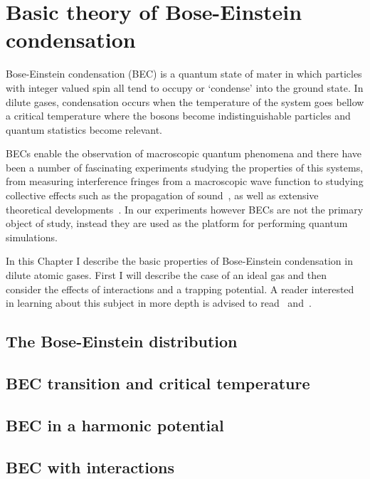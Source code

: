 
\renewcommand{\thechapter}{2}

\chapter{Basic theory of Bose-Einstein condensation}

Bose-Einstein condensation (BEC) is a quantum state of mater in which particles with integer valued spin all tend to occupy or `condense' into the ground state. In dilute gases, condensation occurs when the temperature of the system goes bellow a critical temperature where the bosons become indistinguishable particles and quantum statistics become relevant. 

BECs enable the observation of macroscopic quantum phenomena and there have been a number of fascinating experiments studying the properties of this systems, from measuring interference fringes from a macroscopic wave function to studying collective effects such as the propagation of sound~\cite{ketterle_w._making_1999}, as well as extensive theoretical developments~\cite{dalfovo_theory_1999}. In our experiments however BECs are not the primary object of study, instead they are used as the platform for performing quantum simulations. 

In this Chapter I describe the basic properties of Bose-Einstein condensation in dilute atomic gases. First I will describe the case of an ideal gas and then consider the effects of interactions and a trapping potential. A reader interested in learning about this subject in more depth is advised to read~\cite{Pethick} and~\cite{noauthor_bose-einstein_2003}.

\section{The Bose-Einstein distribution}

\section{BEC transition and critical temperature}
\section{BEC in a harmonic potential}
\section{BEC with interactions}

